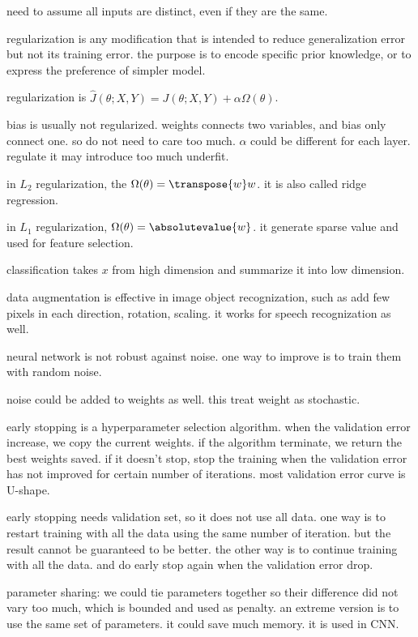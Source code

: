 need to assume all inputs are distinct, even if they are the same.


regularization is any modification that is intended to reduce generalization error but not its training error. the purpose is to encode specific prior knowledge, or to express the preference of simpler model.

regularization is $\hat{J}(\theta;X,Y) = J(\theta;X,Y) + \alpha \Omega(\theta)$.

bias is usually not regularized. weights connects two variables, and bias only connect one. so do not need to care too much. $\alpha$ could be different for each layer. regulate it may introduce too much underfit.

in $L_2$ regularization, the $\Omega(\theta) = \transpose{w}w$. it is also called ridge regression.

in $L_1$ regularization, $\Omega(\theta) = \absolutevalue{w}$. it generate sparse value and used for feature selection.


classification takes $x$ from high dimension and summarize it into low dimension.

data augmentation is effective in image object recognization, such as add few pixels in each direction, rotation, scaling. it works for speech recognization as well.

neural network is not robust against noise. one way to improve is to train them with random noise.

noise could be added to weights as well. this treat weight as stochastic.


early stopping is a hyperparameter selection algorithm. when the validation error increase, we copy the current weights. if the algorithm terminate, we return the best weights saved. if it doesn't stop, stop the training when the validation error has not improved for certain number of iterations. most validation error curve is U-shape.

early stopping needs validation set, so it does not use all data. one way is to restart training with all the data using the same number of iteration. but the result cannot be guaranteed to be better. the other way is to continue training with all the data. and do early stop again when the validation error drop.

parameter sharing: we could tie parameters together so their difference did not vary too much, which is bounded and used as penalty. an extreme version is to use the same set of parameters. it could save much memory. it is used in CNN. 

